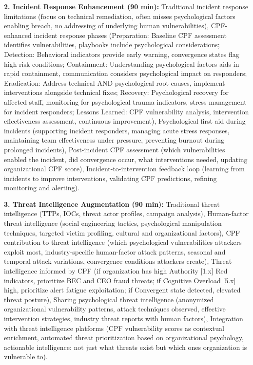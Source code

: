 \documentclass[11pt,a4paper]{article}
\begin{document}
\textbf{2. Incident Response Enhancement (90 min):} Traditional incident response limitations (focus on technical remediation, often misses psychological factors enabling breach, no addressing of underlying human vulnerabilities), CPF-enhanced incident response phases (Preparation: Baseline CPF assessment identifies vulnerabilities, playbooks include psychological considerations; Detection: Behavioral indicators provide early warning, convergence states flag high-risk conditions; Containment: Understanding psychological factors aids in rapid containment, communication considers psychological impact on responders; Eradication: Address technical AND psychological root causes, implement interventions alongside technical fixes; Recovery: Psychological recovery for affected staff, monitoring for psychological trauma indicators, stress management for incident responders; Lessons Learned: CPF vulnerability analysis, intervention effectiveness assessment, continuous improvement), Psychological first aid during incidents (supporting incident responders, managing acute stress responses, maintaining team effectiveness under pressure, preventing burnout during prolonged incidents), Post-incident CPF assessment (which vulnerabilities enabled the incident, did convergence occur, what interventions needed, updating organizational CPF score), Incident-to-intervention feedback loop (learning from incidents to improve interventions, validating CPF predictions, refining monitoring and alerting).

\textbf{3. Threat Intelligence Augmentation (90 min):} Traditional threat intelligence (TTPs, IOCs, threat actor profiles, campaign analysis), Human-factor threat intelligence (social engineering tactics, psychological manipulation techniques, targeted victim profiling, cultural and organizational factors), CPF contribution to threat intelligence (which psychological vulnerabilities attackers exploit most, industry-specific human-factor attack patterns, seasonal and temporal attack variations, convergence conditions attackers create), Threat intelligence informed by CPF (if organization has high Authority [1.x] Red indicators, prioritize BEC and CEO fraud threats; if Cognitive Overload [5.x] high, prioritize alert fatigue exploitation; if Convergent state detected, elevated threat posture), Sharing psychological threat intelligence (anonymized organizational vulnerability patterns, attack techniques observed, effective intervention strategies, industry threat reports with human factors), Integration with threat intelligence platforms (CPF vulnerability scores as contextual enrichment, automated threat prioritization based on organizational psychology, actionable intelligence: not just what threats exist but which ones organization is vulnerable to).
\end{document}

